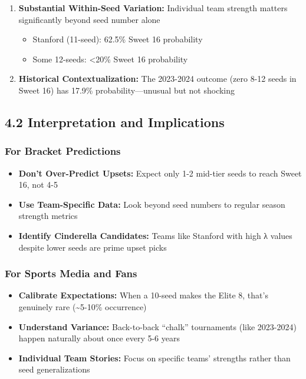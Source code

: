\documentclass[
]{article}
\providecommand{\tightlist}{%
  \setlength{\itemsep}{0pt}\setlength{\parskip}{0pt}}
\begin{document}
\begin{enumerate}
\def\labelenumi{\arabic{enumi}.}
\setcounter{enumi}{3}
\tightlist
\item
  \textbf{Substantial Within-Seed Variation:} Individual team strength
  matters significantly beyond seed number alone

  \begin{itemize}
  \tightlist
  \item
    Stanford (11-seed): 62.5\% Sweet 16 probability
  \item
    Some 12-seeds: \textless20\% Sweet 16 probability
  \end{itemize}
\item
  \textbf{Historical Contextualization:} The 2023-2024 outcome (zero
  8-12 seeds in Sweet 16) has 17.9\% probability---unusual but not
  shocking
\end{enumerate}

\subsection{4.2 Interpretation and
Implications}\label{interpretation-and-implications}

\subsubsection{For Bracket Predictions}\label{for-bracket-predictions}

\begin{itemize}
\tightlist
\item
  \textbf{Don't Over-Predict Upsets:} Expect only 1-2 mid-tier seeds to
  reach Sweet 16, not 4-5
\item
  \textbf{Use Team-Specific Data:} Look beyond seed numbers to regular
  season strength metrics
\item
  \textbf{Identify Cinderella Candidates:} Teams like Stanford with high
  λ values despite lower seeds are prime upset picks
\end{itemize}

\subsubsection{For Sports Media and
Fans}\label{for-sports-media-and-fans}

\begin{itemize}
\tightlist
\item
  \textbf{Calibrate Expectations:} When a 10-seed makes the Elite 8,
  that's genuinely rare (\textasciitilde5-10\% occurrence)
\item
  \textbf{Understand Variance:} Back-to-back ``chalk'' tournaments (like
  2023-2024) happen naturally about once every 5-6 years
\item
  \textbf{Individual Team Stories:} Focus on specific teams' strengths
  rather than seed generalizations
\end{itemize}
\end{document}

